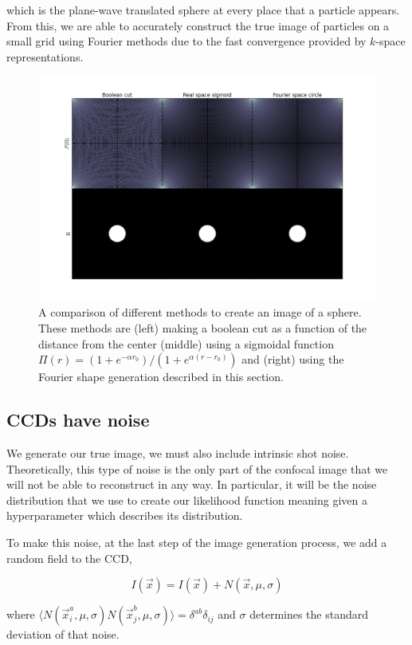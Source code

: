 \documentclass[twocolumn,amsmath,amssymb]{revtex4}
\begin{document}
which is the plane-wave translated sphere at every place that a particle
appears. From this, we are able to accurately construct the true image of
particles on a small grid using Fourier methods due to the fast convergence
provided by $k$-space representations.

\begin{figure}[ht]
    \includegraphics[width=0.95\columnwidth]{figs/sphere_generation_comparison.png}

    \caption{A comparison of different methods to create an image of a sphere.
        These methods are (left) making a boolean cut as a function of the
        distance from the center (middle) using a sigmoidal function $\Pi(r) =
        (1 + e^{-\alpha r_0}) / (1 + e^{\alpha (r - r_0)})$ and (right) using the Fourier shape
    generation described in this section.}

    \label{fig:sphere_generation_comparison}
\end{figure}



\subsection{CCDs have noise}

We generate our true image, we must also include intrinsic shot noise.
Theoretically, this type of noise is the only part of the confocal image
that we will not be able to reconstruct in any way.  In particular, it
will be the noise distribution that we use to create our likelihood function
meaning given a hyperparameter which describes its distribution.

To make this noise, at the last step of the image generation process, we
add a random field to the CCD,

\begin{equation}
    I(\vec{x}) = I(\vec{x}) + N(\vec{x}, \mu, \sigma)
\end{equation}

where $\langle N(\vec{x}^a_i, \mu, \sigma) N(\vec{x}^b_j, \mu, \sigma)\rangle =
\delta^{ab} \delta_{ij}$ and $\sigma$ determines the standard deviation of that
noise.


\end{document}

